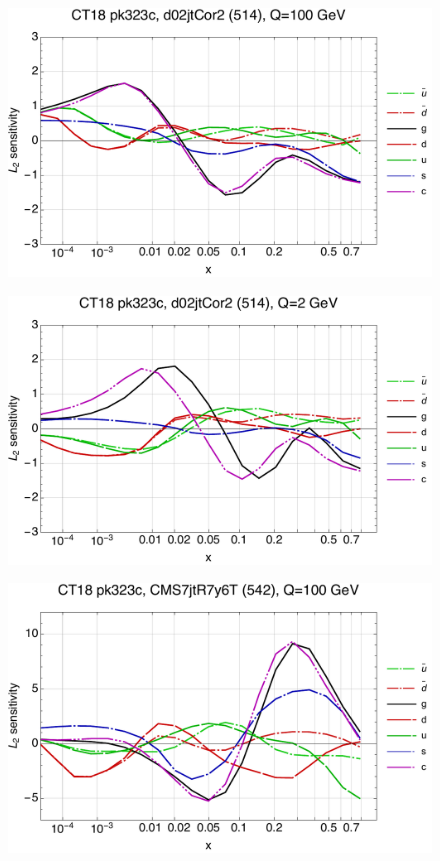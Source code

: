 \documentclass[10pt,aps,prd,floatfix,titlepage]{revtex4}
\begin{document}
\clearpage
\begin{figure}
\includegraphics[width=\textwidth,height=0.44\textheight,keepaspectratio]{1/514_ct18nn_L2_q100_Sf_1.pdf}
\caption{}
\end{figure}
\begin{figure}
\includegraphics[width=\textwidth,height=0.44\textheight,keepaspectratio]{1/514_ct18nn_L2_q2_Sf_1.pdf}
\caption{}
\end{figure}
\clearpage
\begin{figure}
\includegraphics[width=\textwidth,height=0.44\textheight,keepaspectratio]{1/542_ct18nn_L2_q100_Sf_1.pdf}
\caption{}
\end{figure}
\end{document}
